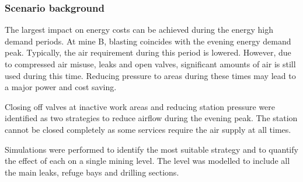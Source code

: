 	\subsubsection{Scenario background}
	The largest impact on energy costs can be achieved during the energy high demand periods. At mine B, blasting coincides with the evening energy demand peak. Typically, the air requirement during this period is lowered. However, due to compressed air misuse, leaks and open valves, significant amounts of air is still used during this time. Reducing pressure to areas during these times may lead to a major power and cost saving. 
	\par 
	Closing off valves at inactive work areas and reducing station pressure were identified as two strategies to reduce airflow during the evening peak. The station cannot be closed completely as some services require the air supply at all times. 
	\par 
	Simulations were performed to identify the most suitable strategy and to quantify the effect of each on a single mining level. The level was modelled to include all the main leaks, refuge bays and drilling sections.  
